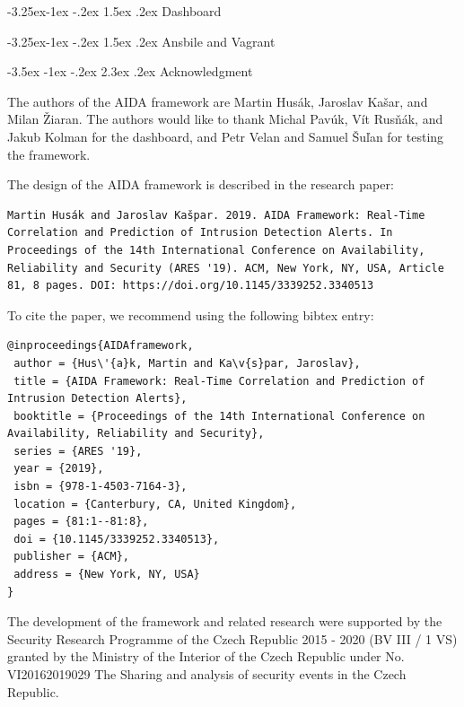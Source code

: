 \documentclass[a4paper]{article} %
\makeatletter
\renewcommand\section{\@startsection {section}{1}{\z@}%
                   {-3.5ex \@plus -1ex \@minus -.2ex}%
                   {2.3ex \@plus.2ex}%
                   {\normalfont\sffamily\Large\bfseries\color{projectcolor}}}
\renewcommand\subsection{\@startsection{subsection}{2}{\z@}%
                   {-3.25ex\@plus -1ex \@minus -.2ex}%
                   {1.5ex \@plus .2ex}%
                   {\normalfont\sffamily\large\bfseries\color{projectcolor}}}
\makeatother
\begin{document}
\subsection{Dashboard}

\subsection{Ansbile and Vagrant}

\cleardoublepage

\section{Acknowledgment}

The authors of the AIDA framework are Martin Hus\'{a}k, Jaroslav Ka\v{s}ar, and Milan \v{Z}iaran. The authors would like to thank Michal Pav\'{u}k, V\'{i}t Rus\v{n}\'{a}k, and Jakub Kolman for the dashboard, and Petr Velan and Samuel \v{S}u\v{l}an for testing the framework.

\bigskip

The design of the AIDA framework is described in the research paper:
\begin{lstlisting}[]
Martin Husák and Jaroslav Kašpar. 2019. AIDA Framework: Real-Time Correlation and Prediction of Intrusion Detection Alerts. In Proceedings of the 14th International Conference on Availability, Reliability and Security (ARES '19). ACM, New York, NY, USA, Article 81, 8 pages. DOI: https://doi.org/10.1145/3339252.3340513
\end{lstlisting}

To cite the paper, we recommend using the following bibtex entry:
\begin{lstlisting}[]
@inproceedings{AIDAframework,
 author = {Hus\'{a}k, Martin and Ka\v{s}par, Jaroslav},
 title = {AIDA Framework: Real-Time Correlation and Prediction of Intrusion Detection Alerts},
 booktitle = {Proceedings of the 14th International Conference on Availability, Reliability and Security},
 series = {ARES '19},
 year = {2019},
 isbn = {978-1-4503-7164-3},
 location = {Canterbury, CA, United Kingdom},
 pages = {81:1--81:8},
 doi = {10.1145/3339252.3340513},
 publisher = {ACM},
 address = {New York, NY, USA}
}
\end{lstlisting}

The development of the framework and related research were supported by the Security Research Programme of the Czech Republic 2015 - 2020 (BV III / 1 VS) granted by the Ministry of the Interior of the Czech Republic under No. VI20162019029 The Sharing and analysis of security events in the Czech Republic.

\end{document}
